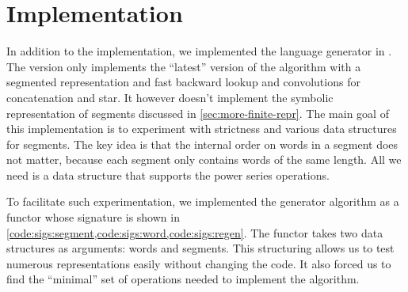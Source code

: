 \section{\ocaml Implementation}
\label{sec:ocaml}

\lstset{language=[Objective]Caml}

In addition to the \haskell implementation, we implemented the language generator
in \ocaml.
The \ocaml version only implements the ``latest'' version of the
algorithm with a segmented representation and fast backward lookup and convolutions
for concatenation and star.
It however doesn't implement the symbolic representation of segments
discussed in \cref{sec:more-finite-repr}.
The main goal of this implementation is to experiment with strictness
and various data structures for segments. 
The key idea is that the internal order on words in a segment does not matter,
because each segment only contains words of the same length.
All we need is a data structure that supports the power series
operations.

To facilitate such experimentation, we implemented the generator
algorithm as a functor whose signature is shown in
\cref{code:sigs:segment,code:sigs:word,code:sigs:regen}.
The functor takes two data structures as arguments: words and segments.
This structuring allows us to test numerous representations easily without changing
the code. It also forced us to find the ``minimal'' set of operations
needed to implement the algorithm.


